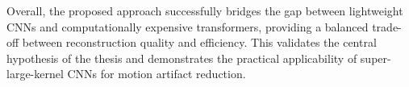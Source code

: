 Overall, the proposed approach successfully bridges the gap between lightweight CNNs and computationally expensive transformers, providing a balanced trade-off between reconstruction quality and efficiency.
This validates the central hypothesis of the thesis and demonstrates the practical applicability of super-large-kernel CNNs for motion artifact reduction.







 





 